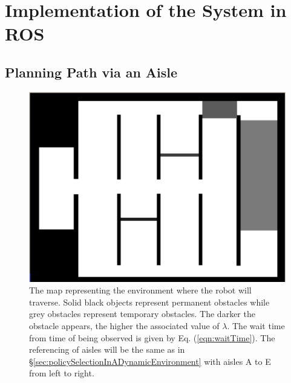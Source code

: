 \documentclass[a4paper,12pt]{article}
\begin{document}
	
	\section{Implementation of the System in ROS}
	
		\subsection{Planning Path via an Aisle}
		
			\begin{figure}[H]
				\centering
				\includegraphics[width=.5\textwidth]{images/stdr_map.png}
				\caption{The map representing the environment where the robot will traverse. Solid black objects represent permanent obstacles while grey obstacles represent temporary obstacles. The darker the obstacle appears, the higher the associated value of $\lambda$. The wait time from time of being observed is given by Eq. (\ref{eqn:waitTime}). The referencing of aisles will be the same as in \S \ref{sec:policySelectionInADynamicEnvironment} with aisles A to E from left to right.}
				\label{fig:stdrMap}
			\end{figure}
			
\end{document}
